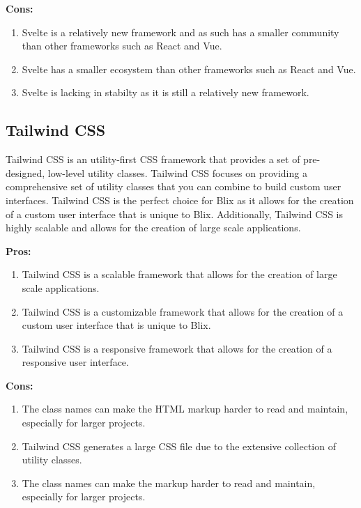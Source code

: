\documentclass[11pt,a4paper]{article}
\begin{document}
\textbf{Cons:}
\begin{enumerate}[label*=\arabic*.]
	\item[\textbullet] Svelte is a relatively new framework and as such has a smaller community than other frameworks such as React and Vue.
	\item[\textbullet] Svelte has a smaller ecosystem than other frameworks such as React and Vue.
	\item[\textbullet] Svelte is lacking in stabilty as it is still a relatively new framework.
\end{enumerate}

\subsection*{Tailwind CSS}
Tailwind CSS is an utility-first CSS framework that provides a set of pre-designed, low-level utility classes. Tailwind CSS focuses on providing a comprehensive set of utility classes that you can combine to build custom user interfaces.
Tailwind CSS is the perfect choice for Blix as it allows for the creation of a custom user interface that is unique to Blix. 
Additionally, Tailwind CSS is highly scalable and allows for the creation of large scale applications.

\textbf{Pros:}
\begin{enumerate}[label*=\arabic*.]
	\item[\textbullet] Tailwind CSS is a scalable framework that allows for the creation of large scale applications.
	\item[\textbullet] Tailwind CSS is a customizable framework that allows for the creation of a custom user interface that is unique to Blix.
	\item[\textbullet] Tailwind CSS is a responsive framework that allows for the creation of a responsive user interface.
\end{enumerate}

\textbf{Cons:}
\begin{enumerate}[label*=\arabic*.]
	\item[\textbullet] The class names can make the HTML markup harder to read and maintain, especially for larger projects.
	\item[\textbullet] Tailwind CSS generates a large CSS file due to the extensive collection of utility classes. 
	\item[\textbullet] The class names can make the markup harder to read and maintain, especially for larger projects.
\end{enumerate}
\end{document}
